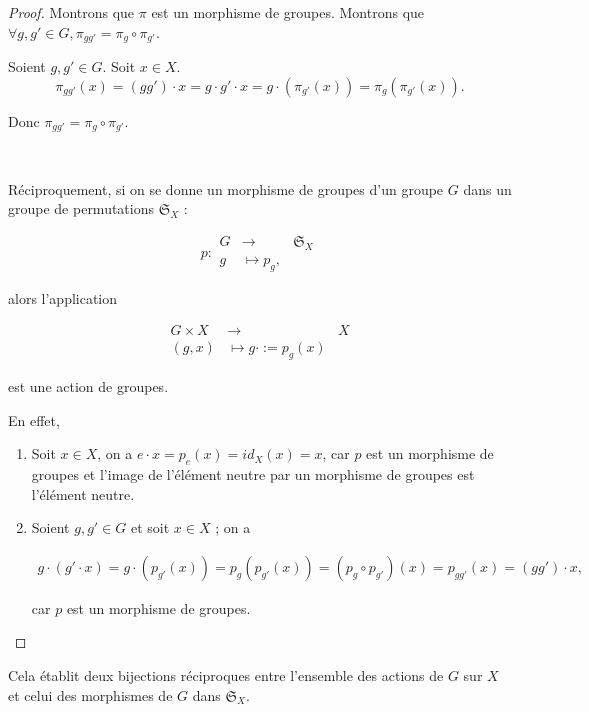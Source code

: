 \documentclass[french]{book}
\begin{document}
\begin{proof}
  Montrons que $\pi$ est un morphisme de groupes. Montrons que $\forall g, g' \in G, \pi _{g g'} = \pi_g \circ \pi _{g'}$.

  Soient $g, g' \in G$. Soit $x \in X$. $$\pi _{ gg'}(x) = (g g') \cdot x = g \cdot g' \cdot x = g \cdot (\pi _{ g'} (x)) = \pi_g (\pi _{ g'}(x)).$$

  Donc $\pi _{ gg'} = \pi_g \circ \pi _{ g'}$.

  \

  Réciproquement, si on se donne un morphisme de groupes d'un groupe $G$ dans un groupe de permutations $\mathfrak{S}_{X} $ :

  \[
  p:
    \begin{array}{rcl}
    G & \longrightarrow & \mathfrak{S}_{X}  \\
    g & \longmapsto p_g,
    \end{array}
  \]

  alors l'application

  \[
    \begin{array}{rcl}
    G \times X & \longrightarrow & X \\
    (g,x) & \longmapsto g \cdot := p_g(x)
    \end{array}
  \]

  est une action de groupes.

  En effet,

  \begin{enumerate}
    \item Soit $x \in X$, on a $e \cdot x = p_e(x) = id_X(x) = x$, car $p$ est un morphisme de groupes et l'image de l'élément neutre par un morphisme de groupes est l'élément neutre.
    \item Soient $g, g' \in G$ et soit $x \in X$ ; on a

    \begin{gather*}
      g \cdot (g' \cdot x) = g \cdot (p _{g'}(x)) = p_g(p _{g'}(x)) = (p_g \circ p _{g'})(x) = p _{gg'}(x) = (gg') \cdot x,
    \end{gather*}

    car $p$ est un morphisme de groupes.
  \end{enumerate}
\end{proof}

Cela établit deux bijections réciproques entre l'ensemble des actions de $G$ sur $X$ et celui des morphismes de $G$ dans $\mathfrak{S}_{X} $.
\end{document}
